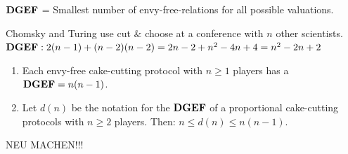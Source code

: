 \underline{$\text{\textbf{DGEF}}$} = Smallest number of envy-free-relations for all possible valuations.
\begin{protokoll*}
 Chomsky and Turing use cut $\&$ choose at a conference with $n$ other scientists.\\
 $\text{\textbf{DGEF}}: 2(n-1)+(n-2)(n-2)=2n-2+n^2-4n+4=n^2-2n+2$
\end{protokoll*}
\begin{satz*}
 \begin{enumerate}
  \item Each envy-free cake-cutting protocol with $n\geq1$ players has a $\text{\textbf{DGEF}} = n(n-1)$.
  \item Let $d(n)$ be the notation for the $\text{\textbf{DGEF}}$ of a proportional cake-cutting protocols with $n\geq2$ players. Then: $n\leq d(n)\leq n(n-1)$.
 \end{enumerate}
\end{satz*}
NEU MACHEN!!!
